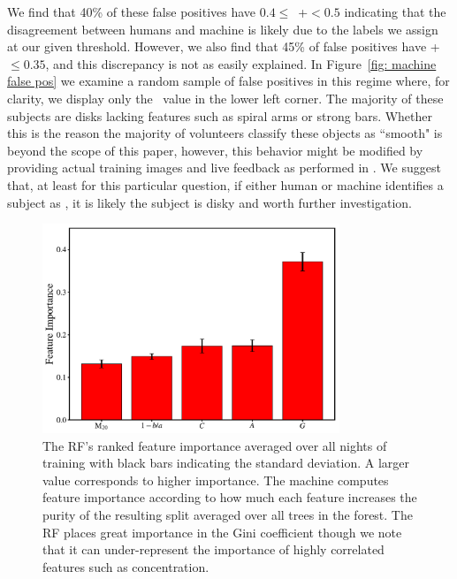 We find that 40\% of these false positives have $0.4 \le$~\ffeat+\fstar$<0.5$ 
indicating that the disagreement between humans and machine is likely due to the 
labels we assign at our given threshold. However, we also find that 45\% of false
positives have \ffeat+\fstar~$\le0.35$, and this discrepancy is not as easily explained. In Figure~\ref{fig: machine false pos} we examine a random sample of false positives in this regime where, for clarity, we display only the \ffeat~value in the lower left corner. The majority of these subjects are disks lacking features such as spiral arms or strong bars. Whether this is the reason the majority of volunteers classify these objects as ``smooth" is beyond the scope of this paper, however, this behavior might be modified by providing actual training images and live feedback as performed in \cite{Marshall2016}. We suggest that, at least for this particular question, if either human or machine identifies a subject as \feat, it is likely the subject is disky and worth further investigation.

\begin{figure}
\centering
\includegraphics[width=3.5in]{Figures/human_machine/RF_feature_importance_4paper.pdf}
\caption[Random Forest's feature importances]{The RF's ranked feature importance averaged over all nights of training with black bars indicating the standard deviation. A larger value corresponds to higher importance. The machine computes feature importance according to how much each feature increases the purity of the resulting split averaged over all trees in the forest. The RF places great importance in the Gini coefficient though we note that it can under-represent the importance of highly correlated features such as concentration.\label{fig: feature importance}}
\end{figure}

